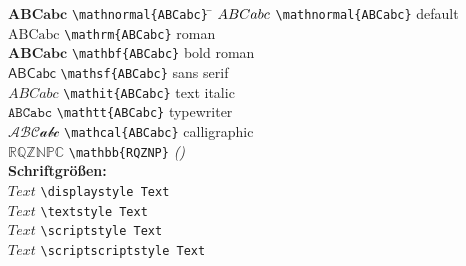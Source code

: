 \setlength{\columnseprule}{0.5pt}
\begin{tabbing}
	$\mathbf{ABCabc}$		\= \lstinline|\mathnormal{ABCabc}| \=		\kill
	$\mathnormal{ABCabc}$	\> \lstinline|\mathnormal{ABCabc}|	 \small default
	\\
	$\mathrm{ABCabc}$		\> \lstinline|\mathrm{ABCabc}|	\> \small roman
	\\
	$\mathbf{ABCabc}$		\> \lstinline|\mathbf{ABCabc}|	\> \small bold roman
	\\
	$\mathsf{ABCabc}$		\> \lstinline|\mathsf{ABCabc}|	\> \small sans serif
	\\
	$\mathit{ABCabc}$		\> \lstinline|\mathit{ABCabc}|	\> \small text italic
	\\
	$\mathtt{ABCabc}$		\> \lstinline|\mathtt{ABCabc}|	\> \small typewriter
	\\
	$\mathcal{ABCabc}$	\> \lstinline|\mathcal{ABCabc}|	\> \small calligraphic
	\\
	$\mathbb{RQZNPC}$	\> \lstinline|\mathbb{RQZNP}| 
		{\footnotesize\slshape()}
	\\[0.5\baselineskip]

\textbf{Schriftgrößen:} 
	\\
	$\displaystyle Text$ \> \lstinline|\displaystyle Text|
		\\
	$\textstyle Text$ \> \lstinline|\textstyle Text|
		\\
	$\scriptstyle Text$ \> \lstinline|\scriptstyle Text|
		\\
	$\scriptscriptstyle Text$ \> \lstinline|\scriptscriptstyle Text|
\end{tabbing}


